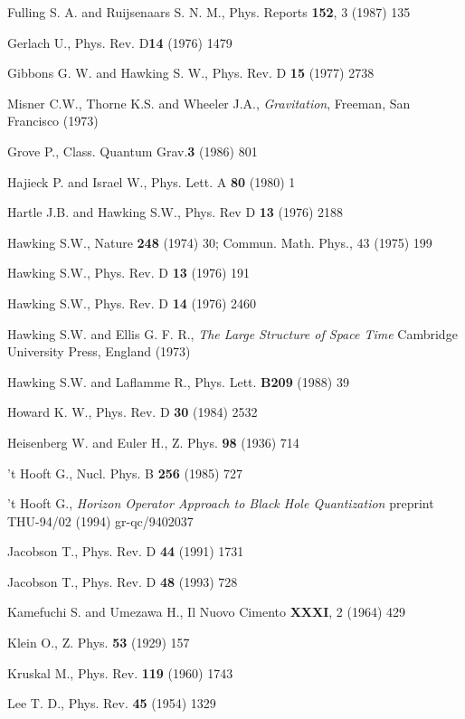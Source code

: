 \documentclass[12pt,oneside]{report}
\begin{document}
{\begin{thebibliography}{999}
Fulling S. A. and Ruijsenaars S. N. M., Phys. Reports {\bf 152}, 3
(1987) 135



Gerlach U., Phys. Rev. D{\bf 14} (1976) 1479

 Gibbons G. W. and Hawking S. W., Phys. Rev. D {\bf
15} (1977) 2738

 Misner C.W., Thorne K.S. and Wheeler J.A., {\em Gravitation}, Freeman, 
San Francisco (1973)

Grove P., Class. Quantum Grav.{\bf  3} (1986) 801

 Hajieck P. and Israel W., Phys. Lett. A {\bf 80} (1980) 1

Hartle J.B. and Hawking S.W., Phys. Rev D {\bf 13} (1976) 2188

Hawking S.W., Nature {\bf  248} (1974) 30;
Commun. Math. Phys., 43 (1975) 199

 Hawking S.W., Phys. Rev. D {\bf 13} (1976) 191

 Hawking S.W., Phys. Rev. D {\bf 14}  (1976)  2460 

 Hawking S.W. and Ellis G. F. R., {\em The Large Structure of Space Time} 
Cambridge University Press, England (1973)

  Hawking S.W. and Laflamme R., Phys. Lett. {\bf B209} (1988) 39

 Howard K. W., Phys. Rev. D {\bf 30} (1984) 2532

Heisenberg W. and Euler H.,  Z. Phys. {\bf  98} (1936) 714

 't Hooft G., Nucl. Phys. B {\bf 256} (1985) 727

 't Hooft G., 
{\em Horizon Operator Approach to Black Hole Quantization} 
preprint THU-94/02 (1994) gr-qc/9402037 


 Jacobson T., Phys. Rev. D {\bf 44} (1991) 1731

 Jacobson T., Phys. Rev. D {\bf 48} (1993) 728

Kamefuchi S. and Umezawa H., Il Nuovo Cimento {\bf  XXXI}, 2 (1964) 429

 Klein O., Z. Phys. {\bf 53} (1929) 157

Kruskal M., Phys. Rev. {\bf 119 }(1960) 1743

Lee T. D., Phys. Rev. {\bf  45} (1954) 1329


\end{thebibliography}}
\end{document}
